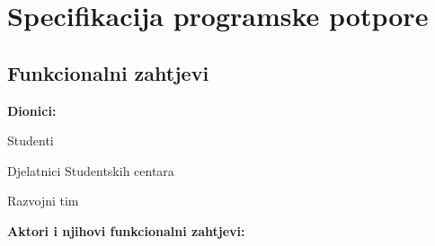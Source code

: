 \chapter{Specifikacija programske potpore}

\section{Funkcionalni zahtjevi}


\noindent \textbf{Dionici:}

\begin{packed_enum}
	
	\item Studenti
	\item Djelatnici Studentskih centara		
	\item Razvojni tim
	
	
\end{packed_enum}

\noindent \textbf{Aktori i njihovi funkcionalni zahtjevi:}



